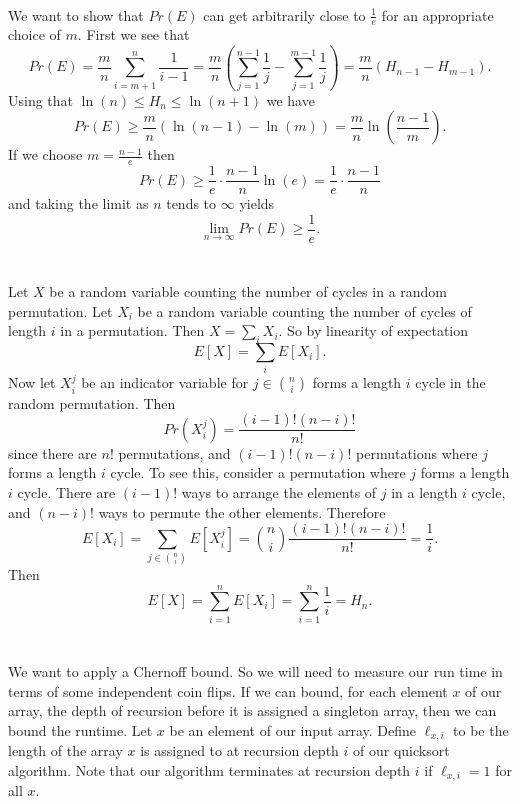 \documentclass[letterpaper,12pt,oneside,onecolumn]{article}
\begin{document}
\paragraph{}
We want to show that $Pr(E)$ can get arbitrarily close to $\frac{1}{e}$ for an appropriate choice of $m$. First we see that
$$Pr(E) =  \frac{m}{n}\sum_{i=m+1}^n \frac{1}{i-1} = \frac{m}{n}(\sum_{j=1}^{n-1}\frac{1}{j} - \sum_{j=1}^{m-1}\frac{1}{j}) =\frac{m}{n}(H_{n-1} - H_{m-1}).$$
Using that $\ln(n) \leq H_n \leq \ln(n+1)$ we have
$$Pr(E) \geq \frac{m}{n}(\ln(n-1) - \ln(m)) = \frac{m}{n}\ln(\frac{n-1}{m}).$$
If we choose $m = \frac{n-1}{e}$ then
$$Pr(E) \geq \frac{1}{e}\cdot\frac{n-1}{n}\ln(e) = \frac{1}{e}\cdot\frac{n-1}{n}$$
and taking the limit as $n$ tends to $\infty$ yields
$$\lim_{n\rightarrow \infty} Pr(E) \geq \frac{1}{e}.$$
\newpage
\section{}
\paragraph{}
Let $X$ be a random variable counting the number of cycles in a random permutation. Let $X_i$ be a random variable counting the number of cycles of length $i$ in a permutation. Then $X = \sum_i X_i$. So by linearity of expectation
$$E[X] = \sum_i E[X_i].$$
Now let $X_i^j$ be an indicator variable for $j \in {n\choose i}$ forms a length $i$ cycle in the random permutation. Then 
$$Pr(X^j_i) = \frac{(i-1)!(n-i)!}{n!}$$
since there are $n!$ permutations, and $(i-1)!(n-i)!$ permutations where $j$ forms a length $i$ cycle. To see this, consider a permutation where $j$ forms a length $i$ cycle. There are $(i-1)!$ ways to arrange the elements of $j$ in a length $i$ cycle, and $(n-i)!$ ways to permute the other elements. Therefore
$$E[X_i] = \sum_{j \in {n\choose i}}E[X_i^j] = {n\choose i} \frac{(i-1)!(n-i)!}{n!} = \frac{1}{i}.$$
Then
$$E[X] = \sum_{i=1}^n E[X_i] = \sum_{i=1}^n \frac{1}{i} = H_n.$$
\newpage
\section{}
\paragraph{}
We want to apply a Chernoff bound. So we will need to measure our run time in terms of some independent coin flips. If we can bound, for each element $x$ of our array, the depth of recursion before it is assigned a singleton array, then we can bound the runtime. Let $x$ be an element of our input array. Define $\ell_{x,i}$ to be the length of the array $x$ is assigned to at recursion depth $i$ of our quicksort algorithm. Note that our algorithm terminates at recursion depth $i$ if $\ell_{x,i}=1$ for all $x$.
\end{document}
